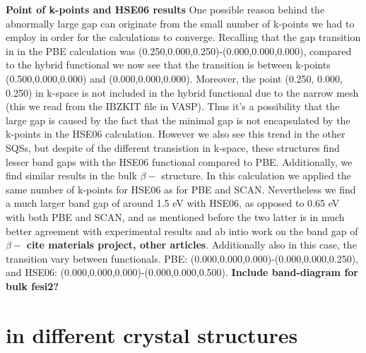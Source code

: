 \textbf{Point of k-points and HSE06 results}
One possible reason behind the abnormally large gap can originate from the small number of k-points we had to employ in order for the calculations to converge. Recalling that the gap transition in in the PBE calculation was (0.250,0.000,0.250)-(0.000,0.000,0.000), compared to the hybrid functional we now see that the transition is between k-points (0.500,0.000,0.000) and (0.000,0.000,0.000). Moreover, the point (0.250, 0.000, 0.250) in k-space is not included in the hybrid functional due to the narrow mesh (this we read from the IBZKIT file in VASP). Thus it's a possibility that the large gap is caused by the fact that the minimal gap is not encapsulated by the k-points in the HSE06 calculation. However we also see this trend in the other SQSs, but despite of the different transistion in k-space, these structures find lesser band gaps with the HSE06 functional compared to PBE. Additionally, we find similar results in the bulk $\beta-$ structure. In this calculation we applied the same number of k-points for HSE06 as for PBE and SCAN. Nevertheless we find a much larger band gap of around 1.5 eV with HSE06, as opposed to 0.65 eV with both PBE and SCAN, and as mentioned before the two latter is in much better agreement with experimental results and ab intio work on the band gap of $\beta-$ \textbf{cite materials project, other articles}. Additionally also in this case, the transition vary between functionals. PBE: (0.000,0.000,0.000)-(0.000,0.000,0.250), and HSE06: (0.000,0.000,0.000)-(0.000,0.000,0.500). \textbf{Include band-diagram for bulk fesi2?} 


\section{ in different crystal structures}

